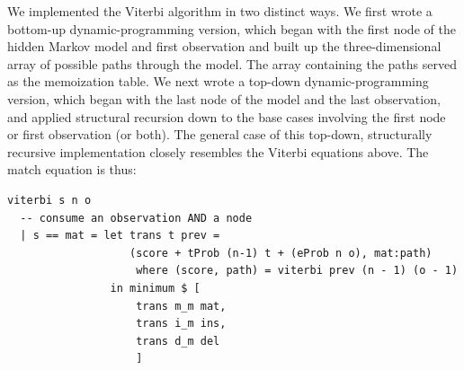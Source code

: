 \documentclass[preprint,nonatbib,blockstyle,nocopyrightspace,times]{sigplanconf}
\begin{document}
We implemented the Viterbi algorithm in two distinct ways.
We first wrote a 
bottom-up dynamic-programming version, which began with the first node of the 
hidden Markov model and first observation and built up the three-dimensional 
array of possible paths through the model.
The array containing the paths 
served as the memoization table.
We next wrote a top-down dynamic-programming 
version, which began with the last node of the model and the last observation, 
and applied structural recursion down to the base cases involving the first 
node or first observation (or both).
The general case of this top-down, structurally recursive implementation closely
resembles the Viterbi equations above.
The match equation is thus:
\begin{verbatim}
viterbi s n o
  -- consume an observation AND a node
  | s == mat = let trans t prev = 
                   (score + tProb (n-1) t + (eProb n o), mat:path)
                    where (score, path) = viterbi prev (n - 1) (o - 1)
                in minimum $ [
                    trans m_m mat,
                    trans i_m ins,
                    trans d_m del
                    ]
\end{verbatim}
\end{document}
